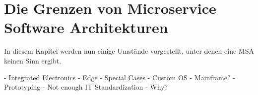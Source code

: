 \newpage
\section{Die Grenzen von Microservice Software Architekturen} \label{wann-nicht-msa}

In diesem Kapitel werden nun einige Umstände vorgestellt, unter denen eine MSA
keinen Sinn ergibt.

- Integrated Electronics
- Edge
- Special Cases
  - Custom OS
  - Mainframe?
- Prototyping
- Not enough IT Standardization
  - Why?
